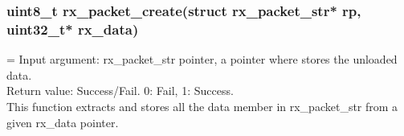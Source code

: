 \subsubsection{uint8\_t rx\_packet\_create(struct rx\_packet\_str* rp, uint32\_t* rx\_data)}
\hangindent=\parindent
{}
Input argument: rx\_packet\_str pointer, a pointer where stores the unloaded data.\\
Return value: Success/Fail. 0: Fail, 1: Success.\\
This function extracts and stores all the data member in rx\_packet\_str from a given rx\_data
pointer. 
